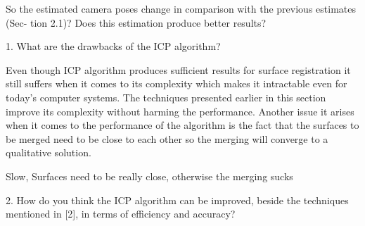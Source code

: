 So the estimated camera poses change in comparison with the previous estimates (Sec- tion 2.1)? Does this estimation produce better results?

1. What are the drawbacks of the ICP algorithm?

Even though ICP algorithm produces sufficient results for surface registration it still suffers when it comes to its complexity which makes it intractable even for today's computer systems. The techniques presented earlier in this section improve its complexity without harming the performance. Another issue it arises when it comes to the performance of the algorithm is the fact that the surfaces to be merged need to be close to each other so the merging will converge to a qualitative solution. 

Slow, Surfaces need to be really close, otherwise the merging sucks

2. How do you think the ICP algorithm can be improved, beside the techniques mentioned in [2], in terms of efficiency and accuracy?



